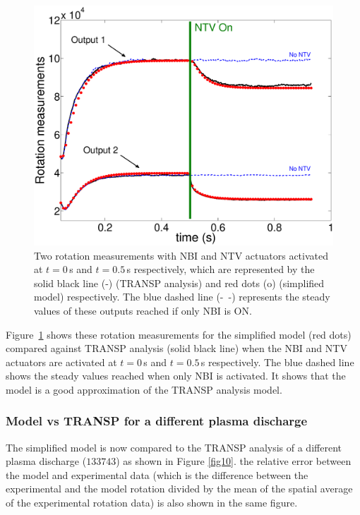 \documentclass[12pt]{iopart}
\begin{document}
\begin{figure}
\centering
\includegraphics[width=\linewidth]{imene_figs/Goum12} 
\caption{Two rotation measurements with NBI and NTV actuators activated at $t=0$\,s and $t=0.5$\,s respectively, which are represented by the solid black line (-) (TRANSP analysis) and red dots (o) (simplified model) respectively. The blue dashed line (-~-) represents the steady values of these outputs reached if only NBI is ON.}
\label{Goum12}
\end{figure}

Figure~\ref{Goum12} shows these rotation measurements for the simplified model (red dots) compared against TRANSP analysis (solid black line) when the NBI and NTV actuators are activated at $t=0$\,s and $t=0.5$\,s respectively. The blue dashed line shows the steady values reached when only NBI is activated. It shows that the model is a good approximation of the TRANSP analysis model.



\subsubsection{Model vs TRANSP for a different plasma discharge}

The simplified model is now compared to the TRANSP analysis of a different plasma discharge ($133743$) as shown in Figure \ref{fig10}. the relative error between the model and experimental data (which is the difference between the experimental and the model rotation divided by the mean of the spatial average of the experimental rotation data) is also shown in  the same figure.
\end{document}
